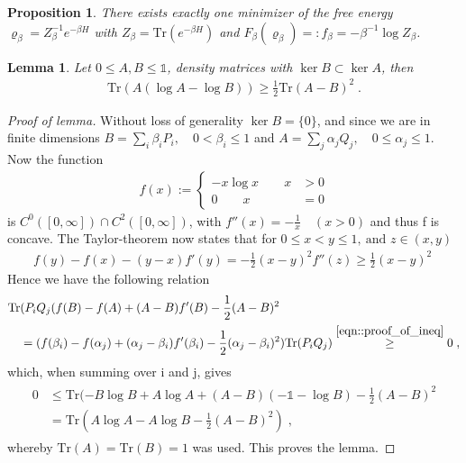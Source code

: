 \documentclass[
a4paper, %
11pt, %
onecolumn, %
openany, %
]{memoir}
\theoremstyle{definition}
\theoremstyle{remark}
\theoremstyle{plain}
\newtheorem{prop}[definition]{Proposition}
\newtheorem{lemma}[definition]{Lemma}
\begin{document}
\begin{prop}
	There exists exactly one minimizer of the free energy $\varrho_{\beta}=Z_{\beta}^{-1}e^{-\beta H}$ with $Z_{\beta}=\mathrm{Tr}(e^{-\beta H})$ and $F_{\beta}(\varrho_{\beta})=:f_{\beta}=-\beta^{-1}\log Z_{\beta}$.
\end{prop}
\begin{lemma}
	Let $0\leq A,B\leq \mathds{1}$, density matrices with $\ker B\subset \ker A$, then \begin{align}
	\mathrm{Tr}(A(\log A-\log B))\geq \frac{1}{2}\mathrm{Tr}(A-B)^2\; .
	\end{align}
\end{lemma}
\begin{proof}[Proof of lemma]
	Without loss of generality $\ker B=\{0\}$, and since we are in finite dimensions $B=\sum_i\beta_iP_i,\quad 0<\beta_i\leq 1$ and $A=\sum_j \alpha_jQ_j, \quad 0\leq \alpha_j\leq 1$. Now the function \begin{align}
	f(x):=\begin{cases}
	-x\log x\qquad  x&>0\\0 \qquad x&=0
	\end{cases}
	\end{align}
	is $C^0([0,\infty])\cap C^2([0,\infty])$, with $f''(x)=-\frac{1}{x}\quad (x>0)$ and thus f is concave. The Taylor-theorem now states that for $0\leq x<y\leq 1,~ \text{and }z\in (x,y)$
	\begin{align}
	f(y)-f(x)-(y-x)f'(y)=-\frac{1}{2}(x-y)^2f''(z)\geq \frac{1}{2}(x-y)^2\;\label{eqn::proof_of_ineq}
	\end{align}
	Hence we have the following relation \begin{align}\begin{split}
	\mathrm{Tr}&(P_iQ_j(f(B)-f(A)+(A-B)f'(B)-\frac{1}{2}(A-B)^2\\
	&=(f(\beta_i)-f(\alpha_j)+(\alpha_j-\beta_i)f'(\beta_i)-\frac{1}{2}(\alpha_j-\beta_i)^2)\mathrm{Tr}(P_iQ_j)\overset{\eqref{eqn::proof_of_ineq}}{\geq }0\; ,\end{split}
	\end{align}
	which, when summing over i and j, gives \begin{align}\begin{split}
	0&\leq \mathrm{Tr}(-B\log B+A\log A +(A-B)(-\mathds{1}-\log B)-\frac{1}{2}(A-B)^2\\
	&=\mathrm{Tr}(A\log A-A\log B-\frac{1}{2}(A-B)^2)\;,\end{split}
	\end{align}
	whereby $\mathrm{Tr}(A)=\mathrm{Tr}(B)=1$ was used. This proves the lemma.
\end{proof}
\end{document}
